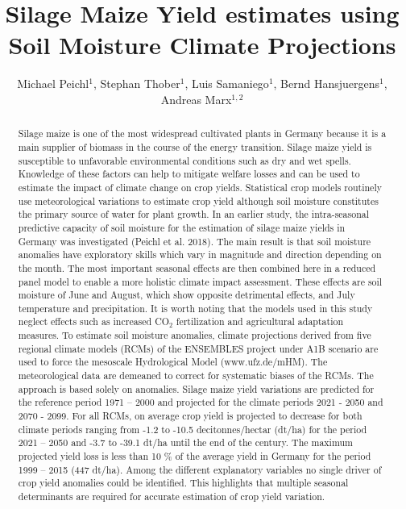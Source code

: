 \documentclass[12pt]{iopart}
\begin{document}
	
\title[Silage Maize Yield Estimates using Soil Moisture Climate Projections]{Silage Maize Yield estimates using Soil Moisture Climate Projections}
\author{Michael Peichl$^1$, Stephan Thober$^1$, Luis Samaniego$^1$, Bernd Hansjuergens$^1$, Andreas Marx$^{1,2}$}

\address{$^1$ Department Computational Hydrosystems, Helmholtz Centre for Environmental Research - UFZ, Permoserstrasse 15, D-04318 Leipzig, Germany}
\address{$^2$ Climate Office for Central Germany, Helmholtz Centre for Environmental Research - UFZ, Permoserstrasse 15, D-04318 Leipzig, Germany}

\begin{abstract}
Silage maize is one of the most widespread cultivated plants in Germany because it is a main supplier of biomass in the course of the energy transition. Silage maize yield is susceptible to unfavorable environmental conditions such as dry and wet spells. Knowledge of these factors can help to mitigate welfare losses and can be used to estimate the impact of climate change on crop yields. 
Statistical crop models routinely use meteorological variations to estimate crop yield although soil moisture constitutes the primary source of water for plant growth. In an earlier study, the intra-seasonal predictive capacity of soil moisture for the estimation of silage maize yields in Germany was investigated  (Peichl et al. 2018). The main result is that soil moisture anomalies have exploratory skills which vary in magnitude and direction depending on the month. 
The most important seasonal effects are then combined here in a reduced panel model to enable a more holistic climate impact assessment. These effects are soil moisture of June and August, which show opposite detrimental effects, and July temperature and precipitation. It is worth noting that the models used in this study neglect effects such as increased CO$_2$ fertilization and agricultural adaptation measures.  
To estimate soil  moisture anomalies, climate projections derived from five regional climate models (RCMs) of the ENSEMBLES project under A1B scenario are used to force the mesoscale Hydrological Model (www.ufz.de/mHM). The meteorological data are demeaned to correct for systematic biases of the RCMs. The approach is based solely on anomalies. Silage maize yield variations are predicted for the reference period 1971 – 2000 and projected for the climate periods  2021 - 2050 and 2070 - 2099. For all RCMs, on average crop yield is projected to decrease for both climate periods ranging from -1.2 to -10.5 decitonnes/hectar (dt/ha) for the period 2021 – 2050 and -3.7 to -39.1 dt/ha until the end of the century. The maximum projected yield loss is less than 10 \% of the average yield in Germany for the period 1999 – 2015 (447  dt/ha). Among the different explanatory variables no single driver of crop yield anomalies could be identified. This highlights that multiple seasonal determinants are required for accurate estimation of crop yield variation. 


\end{abstract}
\end{document}
